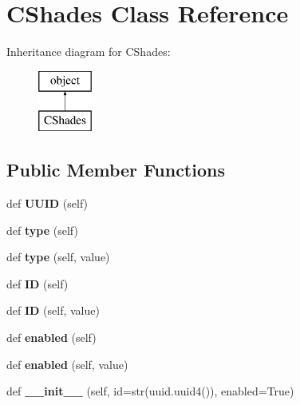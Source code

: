 \hypertarget{class_c_shades_1_1_c_shades}{}\section{C\+Shades Class Reference}
\label{class_c_shades_1_1_c_shades}
Inheritance diagram for C\+Shades\+:\begin{figure}[H]
\begin{center}
\leavevmode
\includegraphics[height=2.000000cm]{class_c_shades_1_1_c_shades}
\end{center}
\end{figure}
\subsection*{Public Member Functions}
\begin{DoxyCompactItemize}
\item 
\mbox{\label{class_c_shades_1_1_c_shades_abbcfc1a774079da020e49c42cbadb693}} 
def {\bfseries U\+U\+ID} (self)
\item 
\mbox{\label{class_c_shades_1_1_c_shades_aff464267544e4efc9b770c8320c8f199}} 
def {\bfseries type} (self)
\item 
\mbox{\label{class_c_shades_1_1_c_shades_aca033702f187894894d3102de41d6b99}} 
def {\bfseries type} (self, value)
\item 
\mbox{\label{class_c_shades_1_1_c_shades_adb8818239148d2e5c5833a2b062ee9ad}} 
def {\bfseries ID} (self)
\item 
\mbox{\label{class_c_shades_1_1_c_shades_a0a178fbcae3f6431733dd63ee37ac7bb}} 
def {\bfseries ID} (self, value)
\item 
\mbox{\label{class_c_shades_1_1_c_shades_a05cd4cd28b324f262fefe1a1782bd992}} 
def {\bfseries enabled} (self)
\item 
\mbox{\label{class_c_shades_1_1_c_shades_a18495e0c3f2639c84751c9aa77cd03b3}} 
def {\bfseries enabled} (self, value)
\item 
\mbox{\label{class_c_shades_1_1_c_shades_a71963b9940a29bf3f2c10546c2cb9b50}} 
def {\bfseries \+\_\+\+\_\+init\+\_\+\+\_\+} (self, id=str(uuid.\+uuid4()), enabled=True)
\end{DoxyCompactItemize}


